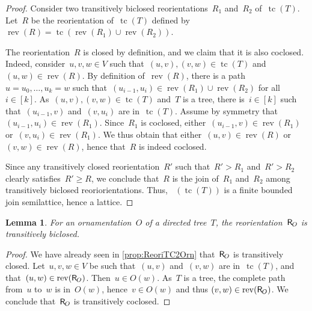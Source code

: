 \documentclass{amsart}
\newtheorem{lemma}[theorem]{Lemma}
\theoremstyle{definition}
\renewcommand{\c}[1]{\mathcal{#1}} %
\DeclareMathOperator{\tc}{tc} %
\newcommand{\mymap}[2]{\mathsf{#1}_{\hspace{-.7pt}#2}}
\newcommand{\reori}[1]{\mymap{R}{#1}}  %
\DeclareMathOperator{\Rbi}{\c{R}^{bi}}  %
\DeclareMathOperator{\rev}{rev} %
\begin{document}
\begin{proof}
Consider two transitively biclosed reorientations~$R_1$ and~$R_2$ of~$\tc(T)$.
Let~$R$ be the reorientation of~$\tc(T)$ defined by~$\rev(R) = \tc(\rev(R_1) \cup \rev(R_2))$.

The reorientation~$R$ is closed by definition, and we claim that it is also coclosed.
Indeed, consider~$u,v,w \in V$ such that~$(u,v), (v,w) \in \tc(T)$ and~$(u,w) \in \rev(R)$.
By definition of~$\rev(R)$, there is a path~$u = u_0, \dots, u_k = w$ such that~$(u_{i-1}, u_i) \in \rev(R_1) \cup \rev(R_2)$ for all~$i \in [k]$.
As~$(u,v), (v,w) \in \tc(T)$ and~$T$ is a tree, there is~$i \in [k]$ such that~$(u_{i-1}, v)$ and~$(v, u_i)$ are in~$\tc(T)$.
Assume by symmetry that~$(u_{i-1}, u_i) \in \rev(R_1)$.
Since~$R_1$ is coclosed, either~$(u_{i-1}, v) \in \rev(R_1)$ or~$(v, u_i) \in \rev(R_1)$.
We thus obtain that either~$(u,v) \in \rev(R)$ or~$(v,w) \in \rev(R)$, hence that~$R$ is indeed coclosed.

Since any transitively closed reorientation~$R'$ such that~$R' > R_1$ and~$R' > R_2$ clearly satisfies~$R' \ge R$, we conclude that~$R$ is the join of~$R_1$ and~$R_2$ among transitively biclosed reoriorientations.
Thus, $\Rbi(\tc(T))$ is a finite bounded join semilattice, hence a lattice.
\end{proof}

\begin{lemma}
\label{lem:Orn2ReoriT}
For an ornamentation~$O$ of a directed tree~$T$, the reorientation~$\reori{O}$ is transitively biclosed.
\end{lemma}

\begin{proof}
We have already seen in \cref{prop:ReoriTC2Orn} that~$\reori{O}$ is transitively closed.
Let~$u, v, w \in V$ be such that~$(u,v)$ and~$(v,w)$ are in~$\tc(T)$,
and that~$(u,w) \in \rev(\reori{O})$. Then~$u \in O(w)$. As~$T$ is a tree, the complete path from~$u$ to~$w$ is in~$O(w)$, hence~$v \in O(w)$ and thus $(v,w) \in \rev(\reori{O})$.
We conclude that~$\reori{O}$ is transitively coclosed.
\end{proof}
\end{document}

